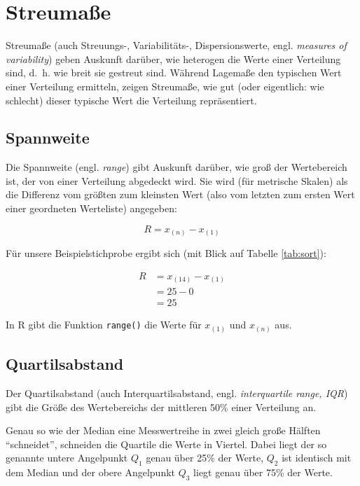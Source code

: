 \documentclass[
  11pt,
  ngerman,
  a4paper,
]{report}
\newenvironment{rtip}{
  \medskip
  \begin{tcolorbox}[colframe=purple,colback=light_gray,title=Softwarehinweis]
}{
  \end{tcolorbox}
  \medskip
}
\begin{document}
\hypertarget{streumauxdfe}{%
\section{Streumaße}\label{streumauxdfe}}

Streumaße (auch Streuungs-, Variabilitäts-, Dispersionswerte, engl. \emph{measures of variability}) geben Auskunft darüber, wie heterogen die Werte einer Verteilung sind, d.~h. wie breit sie gestreut sind. Während Lagemaße den typischen Wert einer Verteilung ermitteln, zeigen Streumaße, wie gut (oder eigentlich: wie schlecht) dieser typische Wert die Verteilung repräsentiert.

\hypertarget{spannweite}{%
\subsection{Spannweite}\label{spannweite}}

Die Spannweite (engl. \emph{range}) gibt Auskunft darüber, wie groß der Wertebereich ist, der von einer Verteilung abgedeckt wird. Sie wird (für metrische Skalen) als die Differenz vom größten zum kleinsten Wert (also vom letzten zum ersten Wert einer geordneten Werteliste) angegeben:

\[
 R=x_{(n)} - x_{(1)}
 \label{eq:range}
\]

Für unsere Beispielstichprobe ergibt sich (mit Blick auf Tabelle \ref{tab:sort}):

\nopagebreak

\[
  \begin{aligned}
     R&=x_{(14)} - x_{(1)} \\[4pt]
     &=25-0 \\[4pt]
     &=25
  \end{aligned}
\]

\begin{rtip}
In R gibt die Funktion \verb|range()| die Werte für $x_{(1)}$ und $x_{(n)}$ aus.
\end{rtip}

\hypertarget{quartilsabstand}{%
\subsection{Quartilsabstand}\label{quartilsabstand}}

Der Quartilsabstand (auch Interquartilsabstand, engl. \emph{interquartile range, IQR}) gibt die Größe des Wertebereichs der mittleren 50\% einer Verteilung an.

Genau so wie der Median eine Messwertreihe in zwei gleich große Hälften \enquote{schneidet}, schneiden die Quartile die Werte in Viertel. Dabei liegt der so genannte untere Angelpunkt \(Q_1\) genau über 25\% der Werte, \(Q_2\) ist identisch mit dem Median und der obere Angelpunkt \(Q_3\) liegt genau über 75\% der Werte.
\end{document}
